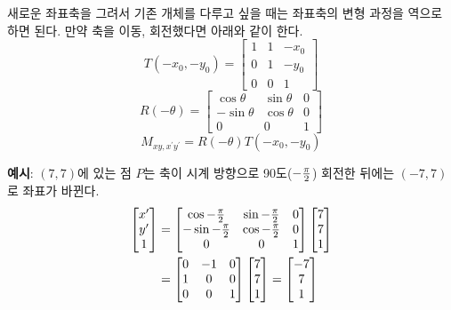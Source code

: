 새로운 좌표축을 그려서 기존 개체를 다루고 싶을 때는 좌표축의 변형 과정을 역으로 하면 된다. 만약 축을 이동, 회전했다면 아래와 같이 한다.
$$
T(-x_0, -y_0) =
\begin{bmatrix}
  1 & 1 & -x_0 \\
  0 & 1 & -y_0 \\
  0 & 0 & 1
\end{bmatrix}
$$
$$
R(-\theta) =
\begin{bmatrix}
  \cos{\theta} & \sin{\theta} & 0 \\
  -\sin{\theta} & \cos{\theta} & 0 \\
  0 & 0 & 1
\end{bmatrix}
$$
$$
M_{xy, x^\prime y^\prime} = R(-\theta) T(-x_0, -y_0)
$$
\newline
\begin{framed}
  \noindent \textbf{예시}: $(7, 7)$에 있는 점 $P$는 축이 시계 방향으로 90도($-{\pi \over 2}$) 회전한 뒤에는 $(-7, 7)$로 좌표가 바뀐다.
  $$
  \begin{aligned}
    \begin{bmatrix}
      x^\prime \\
      y^\prime \\
      1
    \end{bmatrix}
    &=
    \begin{bmatrix}
      \cos-{\pi \over 2} & \sin-{\pi \over 2} & 0 \\
      -\sin-{\pi \over 2} & \cos-{\pi \over 2} & 0 \\
      0 & 0 & 1
    \end{bmatrix}
    \begin{bmatrix}
      7 \\
      7 \\
      1
    \end{bmatrix} \\
    &=
    \begin{bmatrix}
      0 & -1 & 0\\
      1 & 0 & 0 \\
      0 & 0 & 1
    \end{bmatrix}
    \begin{bmatrix}
      7 \\
      7 \\
      1
    \end{bmatrix}
    =
    \begin{bmatrix}
      -7 \\
      7 \\
      1
    \end{bmatrix} \\
  \end{aligned}
  $$
\end{framed}
